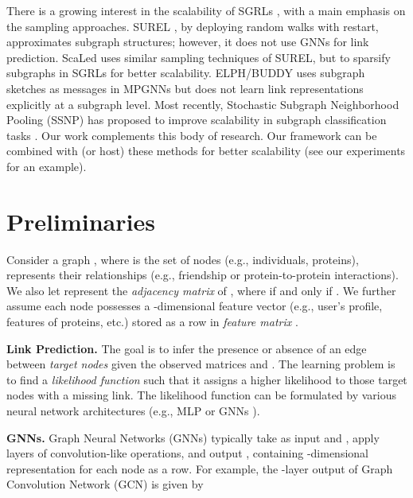 \documentclass[sigconf, nonacm]{acmart}
\newcommand{\scaled}{S\lowercase{ca}L\lowercase{ed}\xspace}
\begin{document}
There is a growing interest in the scalability of SGRLs \cite{yin2022algorithm,louis2022sampling,chamberlain2023graph}, with a main emphasis on the sampling approaches.  SUREL \cite{yin2022algorithm}, by deploying random walks with restart, approximates subgraph structures; however, it does not use GNNs for link prediction. \scaled \cite{louis2022sampling} uses similar sampling techniques of SUREL, but to sparsify subgraphs in SGRLs for better scalability. ELPH/BUDDY \cite{chamberlain2023graph} uses subgraph sketches as messages in MPGNNs but does not learn link representations explicitly at a subgraph level. Most recently, Stochastic Subgraph Neighborhood Pooling (SSNP) \cite{jacob2023stochastic} has proposed to improve scalability in subgraph classification tasks \cite{alsentzer2020subgraph,wang2021glass}. Our work complements this body of research. Our framework can be combined with (or host) these methods for better scalability (see our experiments for an example). 




\section{Preliminaries}

Consider a graph , where  is the set of nodes (e.g., individuals, proteins),  represents their relationships (e.g., friendship or protein-to-protein interactions). We also let 
represent the \emph{adjacency matrix} of , where  if and only if  . We further assume each node possesses a -dimensional feature vector (e.g., user's profile, features of proteins, etc.) stored as a row in \emph{feature matrix} .  

\vskip 1mm
\noindent \textbf{Link Prediction.} The goal is to infer the presence or absence of an edge between \emph{target nodes}  given the observed matrices  and . The learning problem is to find a \emph{likelihood function}  such that it assigns a higher likelihood to those target nodes with a missing link. The likelihood function can be formulated by various neural network architectures (e.g., MLP \cite{guo2022linkless} or GNNs \cite{davidson2018hyperspherical}).

\vskip 1mm
\noindent \textbf{GNNs.} Graph Neural Networks (GNNs) typically take as input  and , apply  layers of convolution-like operations, and output , containing -dimensional representation for each node as a row. For example, the -layer output of Graph Convolution Network (GCN) \cite{kipf2017semi} is given by 
\end{document}
